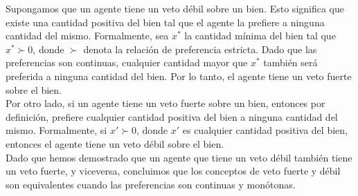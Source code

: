 \begin{enumerate}
	Supongamos que un agente tiene un veto débil sobre un bien. Esto significa que existe una cantidad positiva del bien tal que el agente la prefiere a ninguna cantidad del mismo. Formalmente, sea \( x^* \) la cantidad mínima del bien tal que $x^* \succ 0$, donde $\succ$ denota la relación de preferencia estricta. Dado que las preferencias son continuas, cualquier cantidad mayor que $x^*$ también será preferida a ninguna cantidad del bien. Por lo tanto, el agente tiene un veto fuerte sobre el bien.\\

	Por otro lado, si un agente tiene un veto fuerte sobre un bien, entonces por definición, prefiere cualquier cantidad positiva del bien a ninguna cantidad del mismo. Formalmente, si $x' \succ 0$, donde $x'$ es cualquier cantidad positiva del bien, entonces el agente tiene un veto débil sobre el bien.\\

	Dado que hemos demostrado que un agente que tiene un veto débil también tiene un veto fuerte, y viceversa, concluimos que los conceptos de veto fuerte y débil son equivalentes cuando las preferencias son continuas y monótonas.
\end{enumerate}
